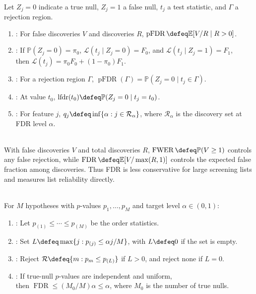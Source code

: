 \begin{definition} \label{def:pfd-local-fdr-and-q-value} \\
Let $Z_j=0$ indicate a true null, $Z_j=1$ a false null, $t_j$ a test statistic, and $\Gamma$ a rejection region.
\begin{enumerate}[label=(\roman*)]
\setlength{\itemsep}{0pt}
\item {}: For false discoveries $V$ and discoveries $R$, $\operatorname{pFDR}\defeq\mathbb{E}[V/R\mid R>0]$.
\item {}: If $\mathbb{P}(Z_j=0)=\pi_0$, $\mathcal{L}(t_j\mid Z_j=0)=F_0$, and $\mathcal{L}(t_j\mid Z_j=1)=F_1$,\\
then $\mathcal{L}(t_j)=\pi_0F_0+(1-\pi_0)F_1$.
\item {}: For a rejection region $\Gamma$, $\operatorname{pFDR}(\Gamma)=\mathbb{P}(Z_j=0\mid t_j\in\Gamma)$.
\item {}: At value $t_0$, $\operatorname{lfdr}(t_0)\defeq\mathbb{P}(Z_j=0\mid t_j=t_0)$.
\item {}: For feature $j$, $q_j\defeq\inf\{\alpha:j\in\mathcal{R}_\alpha\}$, where $\mathcal{R}_\alpha$ is the discovery set at FDR level $\alpha$.
\end{enumerate}
\end{definition}

\begin{remark} \label{rem:fdr-versus-family-wise-error} \\
With false discoveries $V$ and total discoveries $R$, $\operatorname{FWER}\defeq\mathbb{P}(V\geq1)$ controls any false rejection, while $\operatorname{FDR}\defeq\mathbb{E}[V/\max(R,1)]$ controls the expected false fraction among discoveries.
Thus FDR is less conservative for large screening lists and measures list reliability directly.
\end{remark}

\begin{method} \label{meth:benjamini-hochberg-fdr-step-up} \\
For $M$ hypotheses with $p$-values $p_1,\ldots,p_M$ and target level $\alpha\in(0,1)$:
\begin{enumerate}[label=(\roman*)]
\setlength{\itemsep}{0pt}
\item {}: Let $p_{(1)}\leq\cdots\leq p_{(M)}$ be the order statistics.
\item {}: Set $L\defeq\max\{j:p_{(j)}\leq\alpha j/M\}$, with $L\defeq0$ if the set is empty.
\item {}: Reject $\mathcal{R}\defeq\{m:p_m\leq p_{(L)}\}$ if $L>0$, and reject none if $L=0$.
\item {}: If true-null $p$-values are independent and uniform,\\
then $\operatorname{FDR}\leq(M_0/M)\alpha\leq\alpha$, where $M_0$ is the number of true nulls.
\end{enumerate}
\end{method}

